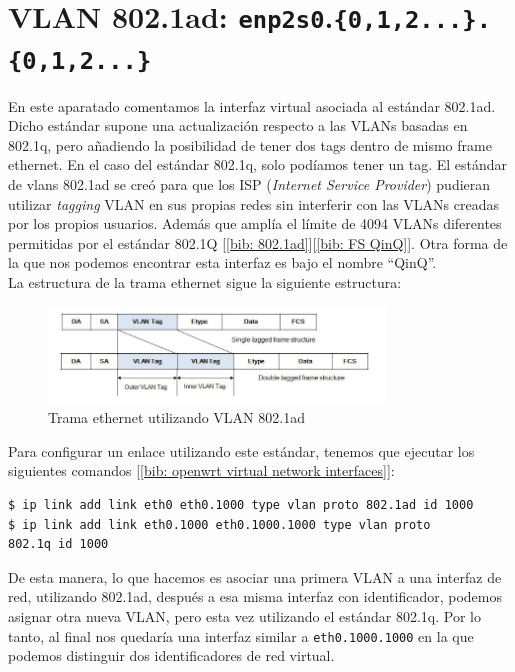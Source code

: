 \documentclass[a4paper, oneside, 12pt]{book}
\begin{document}
	\section{VLAN 802.1ad: \texttt{enp2s0}.\texttt{\{0,1,2...\}.\{0,1,2...\}}}
	\noindent En este aparatado comentamos la interfaz virtual asociada al estándar 802.1ad. Dicho estándar supone una actualización respecto a las VLANs basadas en 802.1q, pero añadiendo la posibilidad de tener dos tags dentro de mismo frame ethernet. En el caso del estándar 802.1q, solo podíamos tener un tag. El estándar de vlans 802.1ad se creó para que los ISP (\textit{Internet Service Provider}) pudieran utilizar \textit{tagging} VLAN en sus propias redes sin interferir con las VLANs creadas por los propios usuarios. Además que amplía el límite de 4094 VLANs diferentes permitidas por el estándar 802.1Q [\ref{bib: 802.1ad}][\ref{bib: FS QinQ}]. Otra forma de la que nos podemos encontrar esta interfaz es bajo el nombre ``QinQ''. \\
	
	\noindent La estructura de la trama ethernet sigue la siguiente estructura:
	
	\begin{figure}[h]
		\begin{center}
			\includegraphics[width=0.8\textwidth]{img/ethernet_8021ad.png}
			\caption{Trama ethernet utilizando VLAN 802.1ad}
			\label{ethernet 802.1ad}
		\end{center}
	\end{figure}
	
	\noindent Para configurar un enlace utilizando este estándar, tenemos que ejecutar los siguientes comandos [\ref{bib: openwrt virtual network interfaces}]:
	\begin{verbatim}
$ ip link add link eth0 eth0.1000 type vlan proto 802.1ad id 1000
$ ip link add link eth0.1000 eth0.1000.1000 type vlan proto 
802.1q id 1000
 	\end{verbatim}
 
 	\noindent De esta manera, lo que hacemos es asociar una primera VLAN a una interfaz de red, utilizando 802.1ad, después a esa misma interfaz con identificador, podemos asignar otra nueva VLAN, pero esta vez utilizando el estándar 802.1q. Por lo tanto, al final nos quedaría una interfaz similar a \texttt{eth0.1000.1000} en la que podemos distinguir dos identificadores de red virtual.
	
\end{document}
